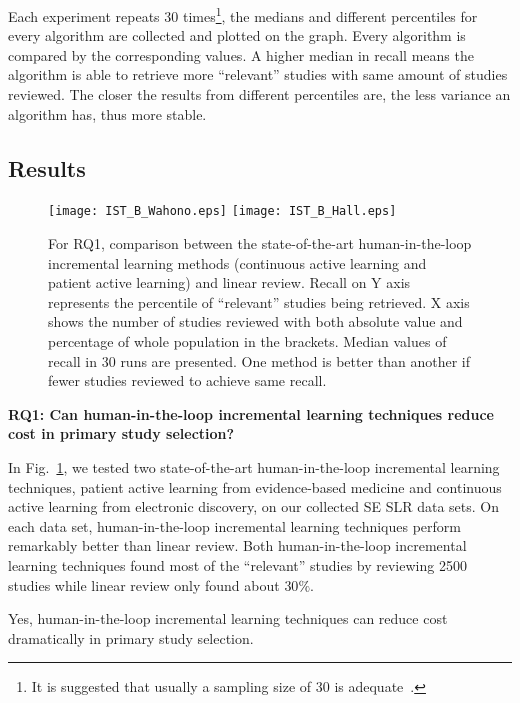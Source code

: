 \documentclass{svjour3}
\theoremstyle{break}
\begin{document}
Each experiment repeats $30$ times\footnote{It is suggested that usually a sampling size of $30$ is adequate~\cite{isotalo2001basics}.}, the medians and different percentiles for every algorithm are collected and plotted on the graph. Every algorithm is compared by the corresponding values. A higher median in recall means the algorithm is able to retrieve more ``relevant'' studies with same amount of studies reviewed. The closer the results from different percentiles are, the less variance an algorithm has, thus more stable.





\subsection{Results}
\label{subsect: Results}


\begin{figure}[t]
    \centering
    \texttt{[image: IST\_B\_Wahono.eps]}
    \texttt{[image: IST\_B\_Hall.eps]}
    \caption{For RQ1, comparison between the state-of-the-art human-in-the-loop incremental learning methods (continuous active learning and patient active learning) and linear review. Recall on Y axis represents the percentile of ``relevant'' studies being retrieved. X axis shows the number of studies reviewed with both absolute value and percentage of whole population in the brackets. Median values of recall in $30$ runs are presented. One method is better than another if fewer studies reviewed to achieve same recall.}
    \label{fig:baselines}
\end{figure}

{\bf RQ1: Can human-in-the-loop incremental learning techniques reduce cost in primary study selection?} 

In Fig.~\ref{fig:baselines}, we tested two state-of-the-art human-in-the-loop incremental learning techniques, patient active learning
from evidence-based medicine and continuous active learning from electronic
discovery, on our collected SE SLR data sets. On each data set, human-in-the-loop incremental learning techniques perform remarkably better than linear review. Both human-in-the-loop incremental learning techniques found most of the ``relevant'' studies by reviewing 2500 studies while linear review only found about $30\%$.

\begin{lesson}
    Yes, human-in-the-loop incremental learning techniques can reduce cost dramatically in primary study selection.
\end{lesson}
\end{document}
